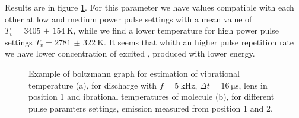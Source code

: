 Results are in figure \ref{fig:TvN2}. For this parameter we have values compatible with each other at low and medium power pulse settings with a mean value of $T_v = \SI{3405(154)}{\kelvin}$, while we find a lower temperature for high power pulse settings $T_v = \SI{2781(322)}{\kelvin}$. It seems that whith an higher pulse repetition rate we have lower concentration of excited , produced with lower energy.
\begin{figure}
\centering
  \hfill
  \caption{Example of boltzmann graph for estimation of vibrational temperature (a), for discharge with $f = \SI{5}{\kilo\hertz}$, $\Delta t = \SI{16}{\micro\second}$, lens in position 1 and ibrational temperatures of  molecule (b), for different pulse paramters settings, emission measured from position 1 and 2.}
  \label{fig:TvN2}
\end{figure}

